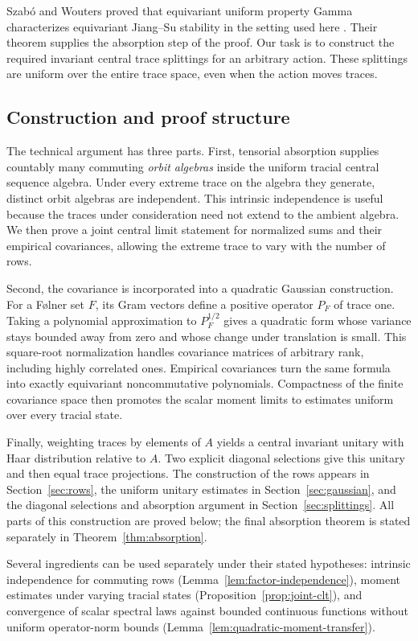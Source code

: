 Szab\'o and Wouters proved that equivariant uniform property Gamma
characterizes equivariant Jiang--Su stability in the setting used here
\cite[Corollary~C]{SzaboWouters2025}. Their theorem supplies the
absorption step of the proof. Our task is to construct the required
invariant central trace splittings for an arbitrary action.
These splittings are uniform over the entire trace space, even when
the action moves traces.

\subsection{Construction and proof structure}

The technical argument has three parts.
First, tensorial absorption supplies countably many commuting
\emph{orbit algebras} inside the uniform tracial central sequence algebra.
Under every extreme trace on the algebra they generate, distinct orbit
algebras are independent. This intrinsic independence is useful because
the traces under consideration need not extend to the ambient algebra.
We then prove a joint central limit statement for normalized sums and
their empirical covariances, allowing the extreme trace to vary with
the number of rows.

Second, the covariance is incorporated into a quadratic Gaussian
construction. For a F{\o}lner set \(F\), its Gram vectors define a
positive operator \(P_F\) of trace one. Taking a polynomial approximation
to \(P_F^{1/2}\) gives a quadratic form whose variance stays bounded
away from zero and whose change under translation is small.
This square-root normalization handles covariance matrices of arbitrary
rank, including highly correlated ones. Empirical covariances turn the
same formula into exactly equivariant noncommutative polynomials.
Compactness of the finite covariance space then promotes the scalar
moment limits to estimates uniform over every tracial state.

Finally, weighting traces by elements of \(A\) yields a central invariant
unitary with Haar distribution relative to \(A\). Two explicit
diagonal selections give this unitary and then equal trace projections.
The construction of the rows appears in Section~\ref{sec:rows}, the
uniform unitary estimates in Section~\ref{sec:gaussian}, and the
diagonal selections and absorption argument in Section~\ref{sec:splittings}.
All parts of this construction are proved below; the final absorption
theorem is stated separately in Theorem~\ref{thm:absorption}.

Several ingredients can be used separately under their stated hypotheses:
intrinsic independence for commuting rows
(Lemma~\ref{lem:factor-independence}), moment estimates under varying
tracial states (Proposition~\ref{prop:joint-clt}), and convergence of
scalar spectral laws against bounded continuous functions without
uniform operator-norm bounds (Lemma~\ref{lem:quadratic-moment-transfer}).
